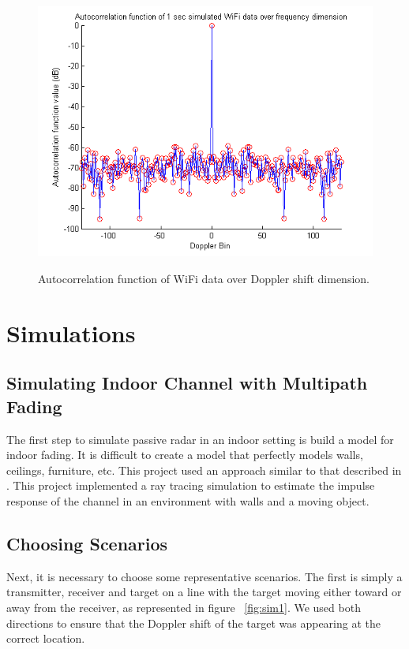 \documentclass[article,11pt,onecolumn,final]{IEEEtran}
\begin{document}
\begin{figure}[H]
	\caption{Autocorrelation function of WiFi data over Doppler shift dimension.}
	\centering
	\includegraphics[width=400pt]{figures/autocorrdopp.png}
	\label{fig:autocorrdopp}
\end{figure}

\section{Simulations}
\subsection{Simulating Indoor Channel with Multipath Fading}
The first step to simulate passive radar in an indoor setting is build a model for indoor fading. It is difficult to create a model that perfectly models walls, ceilings, furniture, etc. This project used an approach similar to that described in \cite{Holt}. This project implemented a ray tracing simulation to estimate the impulse response of the channel in an environment with walls and a moving object. 

\subsection{Choosing Scenarios}
Next, it is necessary to choose some representative scenarios. The first is simply a transmitter, receiver and target on a line with the target moving either toward or away from the receiver, as represented in figure ~\ref{fig:sim1}. We used both directions to ensure that the Doppler shift of the target was appearing at the correct location.
\end{document}
